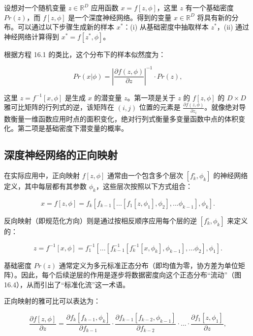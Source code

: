 \documentclass[lang=cn,newtx,10pt,scheme=chinese]{elegantbook}
\begin{document}
设想对一个随机变量 \(z \in \mathbb{R}^D\) 应用函数 \(x = f[z, \phi]\)，这里 \(z\) 有一个基础密度 \(Pr(z)\)，而 \(f[z, \phi]\) 是一个深度神经网络。得到的变量 \(x \in \mathbb{R}^D\) 将具有新的分布。可以通过以下步骤生成新的样本 \(x^*\)：(i) 从基础密度中抽取样本 \(z^*\)，(ii) 通过神经网络计算得到 \(x^* = f[z^*, \phi]\)。

根据方程 16.1 的类比，这个分布下的样本似然度为：

\begin{equation}
Pr(x|\phi) = \left| \frac{\partial f(z, \phi)}{\partial z} \right|^{-1} \cdot Pr(z), 
\end{equation}

这里 \(z = f^{-1}[x, \phi]\) 是生成 \(x\) 的潜变量 \(z\)。第一项是关于 \(z\) 的 \(f[z, \phi]\) 的 \(D \times D\) 雅可比矩阵的行列式的逆，该矩阵在 \((i, j)\) 位置的元素是 \(\frac{\partial f(z, \phi)}{\partial z_i}\)。就像绝对导数衡量一维函数应用时点的面积变化，绝对行列式衡量多变量函数中点的体积变化。第二项是基础密度下潜变量的概率。

\subsection{深度神经网络的正向映射}
在实际应用中，正向映射 \(f[z, \phi]\) 通常由一个包含多个层次 \([f_k^{\circ}, \phi_k]\) 的神经网络定义，其中每层都有其参数 \(\phi_k\)，这些层次按照以下方式组合：

\begin{equation}
x = f[z, \phi] = f_k \left[ f_{k-1} \left[ ... \left[ f_1[z, \phi_1], \phi_2 \right], ... \phi_{k-1} \right], \phi_k \right]. 
\end{equation}

反向映射（即规范化方向）则是通过按相反顺序应用每个层的逆 \([f_k^{\circ}, \phi_k]\) 来定义的：

\begin{equation}
z = f^{-1}[x, \phi] = f_1^{-1} \left[ ... \left[ f_{k-1}^{-1} \left[ f_k^{-1}[x, \phi_k], \phi_{k-1} \right], ... \phi_2 \right], \phi_1 \right]. 
\end{equation}

基础密度 \(Pr(z)\) 通常定义为多元标准正态分布（即均值为零，协方差为单位矩阵）。因此，每个后续逆层的作用是逐步将数据密度向这个正态分布“流动”（图 16.4），从而引出了“标准化流”这一术语。

正向映射的雅可比可以表达为：

\begin{equation}
\frac{\partial f[z, \phi]}{\partial z} = \frac{\partial f_k[f_{k-1}, \phi_k]}{\partial f_{k-1}} \cdot \frac{\partial f_{k-1}[f_{k-2}, \phi_{k-1}]}{\partial f_{k-2}} \cdot ... \cdot \frac{\partial f_1[z, \phi_1]}{\partial z}, 
\end{equation}
\end{document}
